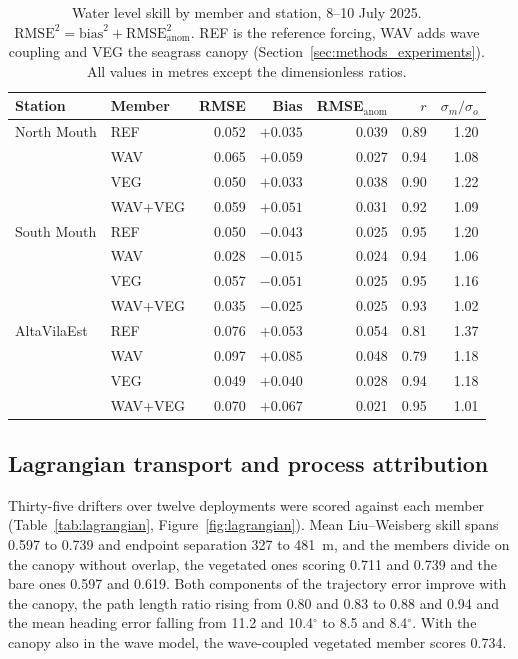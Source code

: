 \begin{table}[H]
  \centering
  \caption{Water level skill by member and station, 8--10 July 2025.
  $\mathrm{RMSE}^2 = \mathrm{bias}^2 + \mathrm{RMSE}_{\mathrm{anom}}^2$. REF is
  the reference forcing, WAV adds wave coupling and VEG the seagrass canopy
  (Section~\ref{sec:methods_experiments}). All values in metres
  except the dimensionless ratios.}
  \label{tab:wl}
  \begin{tabular}{llrrrrr}
    \toprule
    Station & Member & RMSE & Bias & RMSE$_{\mathrm{anom}}$ & $r$ & $\sigma_m/\sigma_o$ \\
    \midrule
    North Mouth & REF & 0.052 & $+0.035$ & 0.039 & 0.89 & 1.20 \\
                & WAV   & 0.065 & $+0.059$ & 0.027 & 0.94 & 1.08 \\
                & VEG   & 0.050 & $+0.033$ & 0.038 & 0.90 & 1.22 \\
                & WAV+VEG     & 0.059 & $+0.051$ & 0.031 & 0.92 & 1.09 \\
    \midrule
    South Mouth & REF & 0.050 & $-0.043$ & 0.025 & 0.95 & 1.20 \\
                & WAV   & 0.028 & $-0.015$ & 0.024 & 0.94 & 1.06 \\
                & VEG   & 0.057 & $-0.051$ & 0.025 & 0.95 & 1.16 \\
                & WAV+VEG     & 0.035 & $-0.025$ & 0.025 & 0.93 & 1.02 \\
    \midrule
    AltaVilaEst & REF & 0.076 & $+0.053$ & 0.054 & 0.81 & 1.37 \\
                & WAV   & 0.097 & $+0.085$ & 0.048 & 0.79 & 1.18 \\
                & VEG   & 0.049 & $+0.040$ & 0.028 & 0.94 & 1.18 \\
                & WAV+VEG     & 0.070 & $+0.067$ & 0.021 & 0.95 & 1.01 \\
    \bottomrule
  \end{tabular}
\end{table}

\subsection{Lagrangian transport and process attribution}
\label{sec:res_drifters}

Thirty-five drifters over twelve deployments were scored against each member
(Table~\ref{tab:lagrangian}, Figure~\ref{fig:lagrangian}). Mean Liu--Weisberg
skill spans 0.597 to 0.739 and endpoint separation 327 to 481~m, and the
members divide on the canopy without overlap, the vegetated ones scoring 0.711
and 0.739 and the bare ones 0.597 and 0.619. Both components of the trajectory
error improve with the canopy, the path length ratio rising from 0.80 and 0.83
to 0.88 and 0.94 and the mean heading error falling from 11.2 and
10.4$^\circ$ to 8.5 and 8.4$^\circ$. With the canopy also in the wave model,
the wave-coupled vegetated member scores 0.734.

